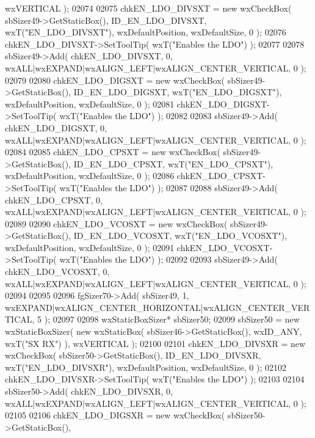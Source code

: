 \begin{DoxyCode}
       wxVERTICAL );
02074     
02075     chkEN_LDO_DIVSXT = \textcolor{keyword}{new} wxCheckBox( sbSizer49->GetStaticBox(), 
      ID_EN_LDO_DIVSXT, wxT(\textcolor{stringliteral}{"EN\_LDO\_DIVSXT"}), wxDefaultPosition, wxDefaultSize, 0 );
02076     chkEN_LDO_DIVSXT->SetToolTip( wxT(\textcolor{stringliteral}{"Enables the LDO"}) );
02077     
02078     sbSizer49->Add( chkEN_LDO_DIVSXT, 0, wxALL|wxEXPAND|wxALIGN\_LEFT|wxALIGN\_CENTER\_VERTICAL, 0 );
02079     
02080     chkEN_LDO_DIGSXT = \textcolor{keyword}{new} wxCheckBox( sbSizer49->GetStaticBox(), 
      ID_EN_LDO_DIGSXT, wxT(\textcolor{stringliteral}{"EN\_LDO\_DIGSXT"}), wxDefaultPosition, wxDefaultSize, 0 );
02081     chkEN_LDO_DIGSXT->SetToolTip( wxT(\textcolor{stringliteral}{"Enables the LDO"}) );
02082     
02083     sbSizer49->Add( chkEN_LDO_DIGSXT, 0, wxALL|wxEXPAND|wxALIGN\_LEFT|wxALIGN\_CENTER\_VERTICAL, 0 );
02084     
02085     chkEN_LDO_CPSXT = \textcolor{keyword}{new} wxCheckBox( sbSizer49->GetStaticBox(), ID_EN_LDO_CPSXT, wxT(\textcolor{stringliteral}{"EN\_LDO\_CPSXT"}), 
      wxDefaultPosition, wxDefaultSize, 0 );
02086     chkEN_LDO_CPSXT->SetToolTip( wxT(\textcolor{stringliteral}{"Enables the LDO"}) );
02087     
02088     sbSizer49->Add( chkEN_LDO_CPSXT, 0, wxALL|wxEXPAND|wxALIGN\_LEFT|wxALIGN\_CENTER\_VERTICAL, 0 );
02089     
02090     chkEN_LDO_VCOSXT = \textcolor{keyword}{new} wxCheckBox( sbSizer49->GetStaticBox(), 
      ID_EN_LDO_VCOSXT, wxT(\textcolor{stringliteral}{"EN\_LDO\_VCOSXT"}), wxDefaultPosition, wxDefaultSize, 0 );
02091     chkEN_LDO_VCOSXT->SetToolTip( wxT(\textcolor{stringliteral}{"Enables the LDO"}) );
02092     
02093     sbSizer49->Add( chkEN_LDO_VCOSXT, 0, wxALL|wxEXPAND|wxALIGN\_LEFT|wxALIGN\_CENTER\_VERTICAL, 0 );
02094     
02095     
02096     fgSizer70->Add( sbSizer49, 1, wxEXPAND|wxALIGN\_CENTER\_HORIZONTAL|wxALIGN\_CENTER\_VERTICAL, 5 );
02097     
02098     wxStaticBoxSizer* sbSizer50;
02099     sbSizer50 = \textcolor{keyword}{new} wxStaticBoxSizer( \textcolor{keyword}{new} wxStaticBox( sbSizer46->GetStaticBox(), wxID\_ANY, wxT(\textcolor{stringliteral}{"SX RX"}) ),
       wxVERTICAL );
02100     
02101     chkEN_LDO_DIVSXR = \textcolor{keyword}{new} wxCheckBox( sbSizer50->GetStaticBox(), 
      ID_EN_LDO_DIVSXR, wxT(\textcolor{stringliteral}{"EN\_LDO\_DIVSXR"}), wxDefaultPosition, wxDefaultSize, 0 );
02102     chkEN_LDO_DIVSXR->SetToolTip( wxT(\textcolor{stringliteral}{"Enables the LDO"}) );
02103     
02104     sbSizer50->Add( chkEN_LDO_DIVSXR, 0, wxALL|wxEXPAND|wxALIGN\_LEFT|wxALIGN\_CENTER\_VERTICAL, 0 );
02105     
02106     chkEN_LDO_DIGSXR = \textcolor{keyword}{new} wxCheckBox( sbSizer50->GetStaticBox(), 

\end{DoxyCode}
